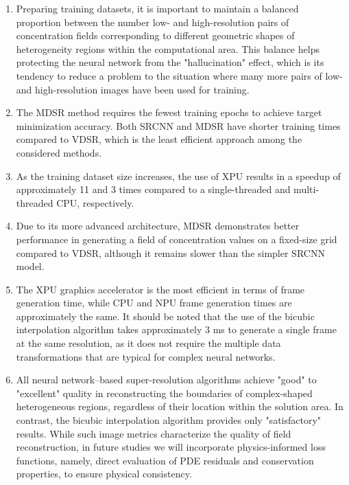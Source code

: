 \documentclass{ieeeaccess}
\begin{document}
\begin{enumerate}
    \item Preparing training datasets, it is  important to maintain a balanced proportion between the number low- and high-resolution pairs of concentration fields  corresponding to different geometric shapes of heterogeneity regions within the computational area.  This balance helps protecting the neural network from the "hallucination" effect, which is its tendency to reduce a problem to the situation where many more pairs of low- and high-resolution images have been used for training.
   
    \item  The MDSR method requires the fewest training epochs to achieve target minimization accuracy. Both SRCNN and MDSR have shorter training times compared to VDSR, which is the least efficient approach among the considered methods.
    
     \item As the training dataset size increases, the use of XPU results in a speedup of approximately 11 and 3 times  compared to a single-threaded and multi-threaded CPU, respectively.
    
    \item Due to its more advanced architecture, MDSR demonstrates better performance in generating a field of concentration values on a fixed-size grid compared to VDSR, although it remains slower than the simpler SRCNN model.
    
    \item The XPU graphics accelerator is the most efficient in terms of frame generation time, while CPU and NPU frame generation times are approximately the same. It should be noted that the use of the bicubic interpolation algorithm takes approximately 3 ms to generate a single frame at the same resolution, as it does not require the multiple data transformations that are typical for complex neural networks.
    
    \item All neural network–based super-resolution algorithms achieve   "good" to "excellent" quality in reconstructing the boundaries of complex-shaped heterogeneous  regions, regardless of their location within the solution area. In contrast, the bicubic interpolation algorithm provides only "satisfactory" results. While such image metrics characterize the  quality of field reconstruction, in future studies we will incorporate physics-informed loss functions, namely, direct evaluation of PDE residuals and conservation properties, to ensure physical consistency.
\end{enumerate}
\end{document}

